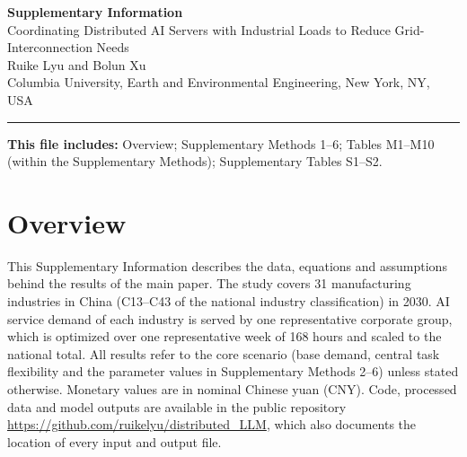 \documentclass[11pt]{article}
\begin{document}
\thispagestyle{plain}
\begin{center}
{\LARGE\bfseries Supplementary Information}\\[10pt]
{\large Coordinating Distributed AI Servers with Industrial Loads to Reduce Grid-Interconnection Needs}\\[12pt]
{\normalsize Ruike Lyu and Bolun Xu}\\[3pt]
{\small Columbia University, Earth and Environmental Engineering, New York, NY, USA}
\end{center}
\vspace{6pt}
\noindent\rule{\textwidth}{0.4pt}
\vspace{2pt}

\noindent\textbf{This file includes:} Overview; Supplementary Methods 1--6; Tables M1--M10 (within the Supplementary Methods); Supplementary Tables S1--S2.

\vspace{4pt}
\renewcommand{\contentsname}{\normalsize Contents}
\begingroup\small
\tableofcontents
\endgroup
\clearpage

\section*{Overview}

\noindent This Supplementary Information describes the data, equations and assumptions behind the results of the main paper. The study covers 31 manufacturing industries in China (C13--C43 of the national industry classification) in 2030. AI service demand of each industry is served by one representative corporate group, which is optimized over one representative week of 168 hours and scaled to the national total. All results refer to the core scenario (base demand, central task flexibility and the parameter values in Supplementary Methods 2--6) unless stated otherwise. Monetary values are in nominal Chinese yuan (CNY). Code, processed data and model outputs are available in the public repository \url{https://github.com/ruikelyu/distributed_LLM}, which also documents the location of every input and output file.
\end{document}
